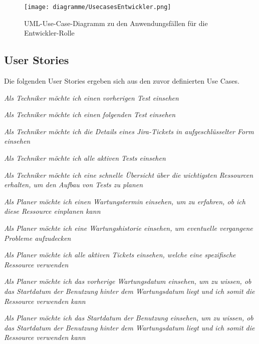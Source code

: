 \begin{figure}[H]
    \texttt{[image: diagramme/UsecasesEntwickler.png]}
    \caption{UML-Use-Case-Diagramm zu den Anwendungsfällen für die Entwickler-Rolle}\label{fig:usecasesEntwickler}
\end{figure}

\subsection{User Stories}\label{sec:userstories}
Die folgenden User Stories ergeben sich aus den zuvor definierten Use Cases.

\begin{description}
    \textit{Als Techniker möchte ich einen vorherigen Test einsehen}

    \textit{Als Techniker möchte ich einen folgenden Test einsehen}

    \textit{Als Techniker möchte ich die Details eines Jira-Tickets in 
    aufgeschlüsselter Form einsehen}

    \textit{Als Techniker möchte ich alle aktiven Tests einsehen}

    \textit{Als Techniker möchte ich eine schnelle Übersicht über die wichtigsten
    Ressourcen erhalten, um den Aufbau von Tests zu planen}

    \textit{Als Planer möchte ich einen Wartungstermin einsehen, um zu erfahren,
    ob ich diese Ressource einplanen kann}

    \textit{Als Planer möchte ich eine Wartungshistorie einsehen, um eventuelle
    vergangene Probleme aufzudecken}

    \textit{Als Planer möchte ich alle aktiven Tickets einsehen, 
    welche eine spezifische Ressource verwenden}

    \textit{Als Planer möchte ich das vorherige Wartungsdatum einsehen, 
    um zu wissen, ob das Startdatum der Benutzung hinter dem Wartungsdatum liegt
    und ich somit die Ressource verwenden kann}

    \textit{Als Planer möchte ich das Startdatum der Benutzung einsehen,
    um zu wissen, ob das Startdatum der Benutzung hinter dem Wartungsdatum liegt
    und ich somit die Ressource verwenden kann }


\end{description}
